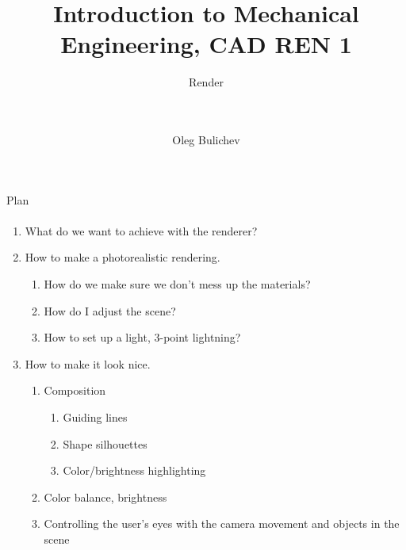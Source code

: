 \documentclass[aspectratio=169]{beamer}
\title[IME]{Introduction to Mechanical Engineering, CAD REN 1} %
\subtitle{Render  
\\ \  
\\ \ 
    } %
\author{Oleg Bulichev}
\newcommand{\fbckg}[1]{\usebackgroundtemplate{\texttt{[image: \#1]}}}%
\begin{document}
\setlength{\abovedisplayskip}{0pt}
\setlength{\belowdisplayskip}{0pt}
\setlength{\abovedisplayshortskip}{0pt}
\setlength{\belowdisplayshortskip}{0pt}

\fbckg{fibeamer/figs/title_page.png}

\fbckg{fibeamer/figs/common.png}

\note{\scriptsize
}

\begin{frame}[t]{Plan}
\framesubtitle{}
\begin{enumerate}
    \item What do we want to achieve with the renderer?
    \item How to make a photorealistic rendering.
    \begin{enumerate}
        \item How do we make sure we don't mess up the materials?
        \item How do I adjust the scene?
        \item How to set up a light, 3-point lightning?
    \end{enumerate}
    \item How to make it look nice. 
    \begin{enumerate}
        \item Composition
        \begin{enumerate}
            \item Guiding lines
            \item Shape silhouettes
            \item Color/brightness highlighting
        \end{enumerate}
        \item Color balance, brightness
        \item Controlling the user's eyes with the camera movement and objects in the scene
    \end{enumerate}
\end{enumerate}
\end{frame}
\end{document}
